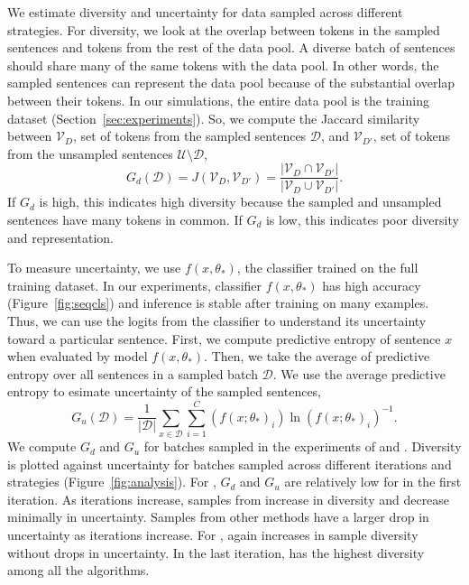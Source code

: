 We estimate diversity and uncertainty for data sampled across different
strategies.
For
diversity, we look at the overlap between tokens in the
sampled sentences and tokens from the rest of the data pool.
A diverse
batch of sentences should share many of the same tokens with the data
pool.
In other words, the sampled sentences can represent the data pool because of
the substantial
overlap between their tokens.
In our simulations,
the entire data pool is the training dataset (Section~\ref{sec:experiments}).
So, we compute the Jaccard similarity between $\mathcal{V}_D$, set of
tokens from the sampled sentences $\mathcal{D}$, and $\mathcal{V}_{D'}$, set of
tokens from the unsampled sentences $\mathcal{U} \setminus \mathcal{D}$,
\begin{equation}
    G_d(\mathcal{D}) = J(\mathcal{V}_D, \mathcal{V}_{D'}) =
\frac{|\mathcal{V}_D \cap \mathcal{V}_{D'}|}{|\mathcal{V}_D \cup
\mathcal{V}_{D'}|}.
\end{equation}
If $G_d$ is high, this indicates high diversity because the sampled
and unsampled sentences have many tokens in common.
If $G_d$ is low, this indicates poor diversity and representation.

To measure uncertainty, we use $f(x,\theta_{*})$, the classifier
trained on the full training dataset.   In our experiments, classifier
$f(x,\theta_{*})$ has high accuracy (Figure~\ref{fig:seqcls}) and inference is stable
after training on many examples.  Thus, we can use the logits from the
classifier to understand its uncertainty toward a particular sentence. First, we
compute predictive entropy of sentence $x$ when evaluated by model $f(x,\theta_{*})$.  Then, we
take the average of predictive entropy over all sentences in a sampled batch
$\mathcal{D}$.
We use the average predictive entropy to esimate uncertainty of the sampled
sentences,
\begin{equation}
    G_u(\mathcal{D}) = \frac{1}{|\mathcal{D}|} \sum_{x \in \mathcal{D}} \sum_{i=1}^{C}
    (f(x; \theta_{*})_i) \ln (f(x; \theta_{*})_i)^{-1}.
\end{equation}
We compute $G_d$ and $G_u$ for batches sampled in the \al{}
experiments of \agnews{} and \pubmed.  Diversity is plotted against uncertainty for
batches sampled across different iterations and \al{} strategies
(Figure~\ref{fig:analysis}).  For \agnews{}, $G_d$ and $G_u$ are
relatively low for \alps{} in the first iteration.  As iterations
increase, samples from \alps{} increase in diversity and decrease minimally in
uncertainty.
Samples from other methods have a larger drop in uncertainty as iterations
increase.
For \pubmed, \alps{} again increases in sample diversity without
drops in uncertainty.  In the last iteration, \alps{} has the highest diversity
among all the algorithms.







